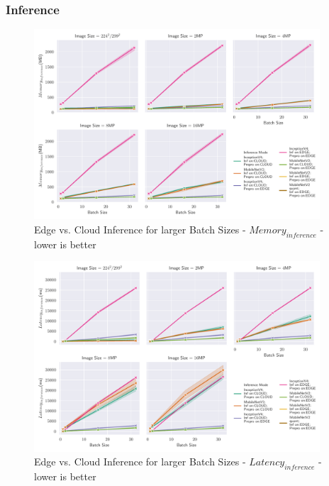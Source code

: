 \FloatBarrier
\subsubsection{Inference}

\begin{figure}[!htb]
\centering
\includegraphics[width=0.95\textwidth]{./Bilder/single_plots/batch_size_plots/Effects_of_Batch_size_Inference_Memory.pdf}
\caption{Edge vs. Cloud Inference for larger Batch Sizes -  $Memory_{inference}$ - lower is better}
\label{fig:BatchSizeInferenceMemory}
\end{figure}
\begin{figure}[!htb]
\centering
\includegraphics[width=0.95\textwidth]{./Bilder/single_plots/batch_size_plots/Effects_of_Batch_size_Inference_Latencies.pdf}
\caption{Edge vs. Cloud Inference for larger Batch Sizes -  $Latency_{inference}$ - lower is better}
\label{fig:BatchSizeInferenceLatency}
\end{figure}



